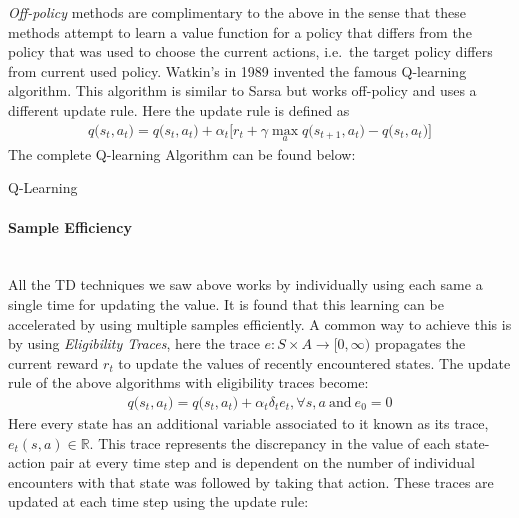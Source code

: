 \documentclass[12pt]{extarticle}
\newcommand{\myparagraph}[1]{\paragraph{#1}\mbox{}\\ \linebreak}
\numberwithin{equation}{section}
\begin{document}
	\textit{Off-policy} methods are complimentary to the above in the sense that these methods attempt to learn a value function for a policy that differs from the policy that was used to choose the current actions, i.e.\ the target policy differs from current used policy. Watkin's in 1989 invented the famous Q-learning algorithm\cite{watkins1989Qlearning}. This algorithm is similar to Sarsa but works off-policy and uses a different update rule. Here the update rule is defined as 
	\begin{align}\label{eq:q-update}
	q\big(s_t,a_t\big) = q\big(s_t,a_t\big) + \alpha_t\big[r_t + \gamma \max_{a}q\big(s_{t+1},a_t\big) - q\big(s_t,a_t\big)\big]
	\end{align}
	The complete Q-learning Algorithm can be found below:
	\begin{algorithm}[h]
		\DontPrintSemicolon
		\SetAlgoLined
		
		\caption{Q-Learning}\label{alg:q-learning}
	\end{algorithm}
	\myparagraph{Sample Efficiency}
	All the TD techniques we saw above works by individually using each same a single time for updating the value. It is found that this learning can be accelerated by using multiple samples efficiently. A common way to achieve this is by using \textit{Eligibility Traces}, here the trace $e \colon S \times A \rightarrow [0,\infty)$ propagates the current reward $r_t$ to update the values of recently encountered states. The update rule of the above algorithms with eligibility traces become:
	\begin{align}
	q\big(s_t,a_t\big) = q\big(s_t,a_t\big) + \alpha_t\delta_{t}e_t, \forall s,a \ \text{and} \ e_0 = 0
	\end{align}
	Here every state has an additional variable associated to it known as its trace, $e_t(s,a) \in \mathbb{R}$. This trace represents the discrepancy in the value of each state-action pair at every time step and is dependent on the number of individual encounters with that state was followed by taking that action. These traces are updated at each time step using the update rule:
\end{document}
